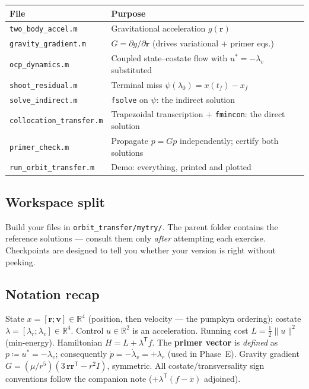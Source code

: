 \documentclass[11pt,letterpaper]{article}
\newcommand{\R}{\mathbb{R}}
\newcommand{\T}{^{\mathsf{T}}}
\newcommand{\half}{\tfrac12}
\newcommand{\rvec}{\mathbf{r}}
\newcommand{\vvec}{\mathbf{v}}
\begin{document}
\begin{center}
\begin{tabular}{lp{9.2cm}}
\toprule
File & Purpose \\
\midrule
\texttt{two\_body\_accel.m}     & Gravitational acceleration $g(\rvec)$ \\
\texttt{gravity\_gradient.m}    & $G = \partial g/\partial\rvec$ (drives variational + primer eqs.) \\
\texttt{ocp\_dynamics.m}        & Coupled state--costate flow with $u^*=-\lambda_v$ substituted \\
\texttt{shoot\_residual.m}      & Terminal miss $\psi(\lambda_0) = x(t_f) - x_f$ \\
\texttt{solve\_indirect.m}      & \texttt{fsolve} on $\psi$: the indirect solution \\
\texttt{collocation\_transfer.m}& Trapezoidal transcription + \texttt{fmincon}: the direct solution \\
\texttt{primer\_check.m}        & Propagate $\ddot p = Gp$ independently; certify both solutions \\
\texttt{run\_orbit\_transfer.m} & Demo: everything, printed and plotted \\
\bottomrule
\end{tabular}
\end{center}

\subsection{Workspace split}

Build your files in \texttt{orbit\_transfer/mytry/}. The parent folder
contains the reference solutions --- consult them only \emph{after}
attempting each exercise. Checkpoints are designed to tell you whether your
version is right without peeking.

\subsection{Notation recap}

State $x = [\rvec; \vvec] \in \R^4$ (position, then velocity --- the pumpkyn
ordering); costate $\lambda = [\lambda_r; \lambda_v] \in \R^4$. Control $u \in
\R^2$ is an acceleration. Running cost $L = \half\|u\|^2$ (min-energy).
Hamiltonian $H = L + \lambda\T f$. The \textbf{primer vector} is
\emph{defined} as $p \coloneqq u^* = -\lambda_v$; consequently
$\dot p = -\dot\lambda_v = +\lambda_r$ (used in Phase~E). Gravity gradient
$G = (\mu/r^5)(3\,\rvec\rvec\T - r^2 I)$, symmetric. All costate/transversality
sign conventions follow the companion note ($+\lambda\T(f-\dot x)$ adjoined).
\end{document}
